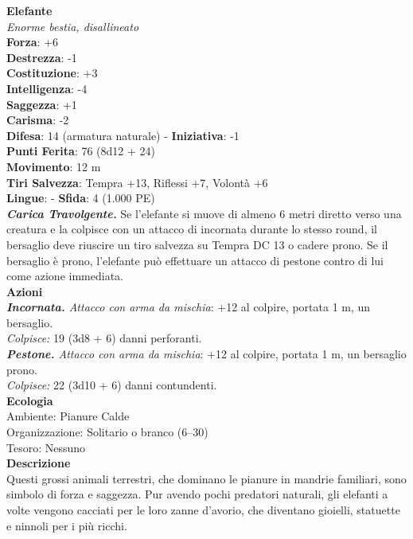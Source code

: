 \begin{multicols}{2}
\medskip\textbf{Elefante}\\
\emph{Enorme bestia, disallineato}\\
\textbf{Forza}: +6\\
\textbf{Destrezza}: -1\\
\textbf{Costituzione}: +3\\
\textbf{Intelligenza}: -4\\
\textbf{Saggezza}: +1\\
\textbf{Carisma}: -2\\
\textbf{Difesa}: 14 (armatura naturale) - \textbf{Iniziativa}: -1\\
\textbf{Punti Ferita}: 76 (8d12 + 24)\\
\textbf{Movimento}: 12 m\\
\textbf{Tiri Salvezza}: Tempra +13, Riflessi +7, Volontà +6 \\
\textbf{Lingue}: -
\textbf{Sfida}: 4 (1.000 PE)\smallskip\\
\emph{\textbf{Carica Travolgente.}} Se l'elefante si muove di almeno 6 metri diretto verso una creatura e la colpisce con un attacco di incornata durante lo stesso round, il bersaglio deve riuscire un tiro salvezza su Tempra DC  13 o cadere prono. Se il bersaglio è prono, l'elefante può effettuare un attacco di pestone contro di lui come azione immediata.\\
\smallskip\textbf{Azioni}\\
\emph{\textbf{Incornata.} Attacco con arma da mischia}: +12 al colpire, portata 1 m, un bersaglio.\\
\emph{Colpisce:} 19 (3d8 + 6) danni perforanti.\\
\emph{\textbf{Pestone.} Attacco con arma da mischia}: +12 al colpire, portata 1 m, un bersaglio prono.\\
\emph{Colpisce:} 22 (3d10 + 6) danni contundenti.\\
\textbf{Ecologia}\\
Ambiente: Pianure Calde\\
Organizzazione: Solitario o branco (6–30)\\
Tesoro: Nessuno\\
\textbf{Descrizione}\\

Questi grossi animali terrestri, che dominano le pianure in mandrie familiari, sono simbolo di forza e saggezza. Pur avendo pochi predatori naturali, gli elefanti a volte vengono cacciati per le loro zanne d’avorio, che diventano gioielli, statuette e ninnoli per i più ricchi. \\


\end{multicols}
